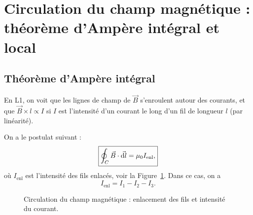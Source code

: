 \section[Circulation du champ magnétique]{Circulation du champ magnétique : théorème d'Ampère intégral et local}

    \subsection{Théorème d'Ampère intégral}

        En L1, on voit que les lignes de champ de $\vec{B}$ s'enroulent autour des courants, et que $\vec{B}\times l\propto I$ si $I$ est l'intensité d'un courant le long d'un fil de longueur $l$ (par linéarité).

        On a le postulat suivant :
        \begin{equation}
            \boxed{
                \oint_{C}\vec{B}\cdot\vec{\mathrm{d} l}=\mu_0 I_{\text{enl}},
            }
        \end{equation}
        où $I_{\text{enl}}$ est l'intensité des fils \og enlacés\fg, voir la Figure~\ref{fig:intensite_fil_enlances_circulation_champ_magnetique}. Dans ce cas, on a 
        \begin{equation}
            I_{\text{enl}}=I_1-I_2-I_3.
        \end{equation}

        \begin{figure}
            \centering
            \caption{Circulation du champ magnétique : enlacement des fils et intensité du courant.}
            \label{fig:intensite_fil_enlances_circulation_champ_magnetique}
        \end{figure}


